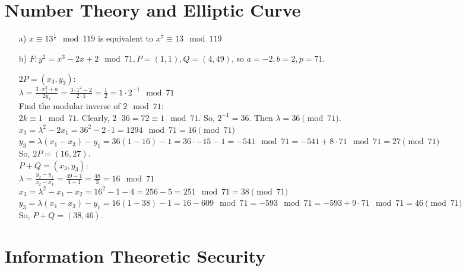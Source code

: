 \documentclass[10pt, oneside]{article}
\begin{document}
\section{Number Theory and Elliptic Curve}
\begin{itemize}
    \item[a)] $x \equiv 13^{\frac{1}{7}} \mod 119$ is equivalent to $x^7 \equiv 13 \mod 119$ 
    \item[b)] $F: y^2 = x^3 - 2x + 2 \mod 71, P=(1,1), Q = (4,49)$, so $a = -2, b = 2, p = 71$.
    
    $2P =(x_3, y_3):$ \\
    $\lambda = \frac{3\cdot x_1^2 + a}{2y_1} = \frac{3 \cdot 1^2 -2 }{2 \cdot 1} = \frac{1}{2} = 1 \cdot 2^{-1} \mod 71$ \\

    Find the modular inverse of $2 \mod 71$: \\
    $2k \equiv 1 \mod 71$. Clearly, $2\cdot 36 = 72 \equiv 1 \mod 71$. So, $2^{-1} = 36$. Then $\lambda = 36 \pmod{71}$.\\
    
    $x_3 = \lambda^2 - 2x_1 = 36^2 - 2 \cdot 1 = 1294 \mod 71 =  16 \pmod{71}$ \\
    $y_3 = \lambda(x_1 - x_3) - y_1 = 36(1-16) - 1 = 36 \cdot -15 - 1 = -541 \mod 71= -541 + 8\cdot 71 \mod 71 = 27 \pmod{71}$ \\
    
    So, $2P = (16, 27)$. \\

    $P + Q = (x_3, y_3):$\\
    $\lambda = \frac{y_2 - y_1}{x_2 - x_1} = \frac{49 - 1}{4 - 1} = \frac{48}{3} = 16 \mod 71$\\

    $x_3 = \lambda^2 - x_1 - x_2 = 16^2 - 1 - 4 = 256 - 5 = 251 \mod 71 =  38 \pmod{71}$ \\
    $y_3 = \lambda(x_1 - x_3) - y_1 = 16(1-38) - 1 = 16 - 609 \mod 71 = -593 \mod 71 = -593 + 9 \cdot 71 \mod 71= 46 \pmod{71}$ \\
    So, $P + Q = (38, 46)$.
\end{itemize}

\section{Information Theoretic Security}
\end{document}
